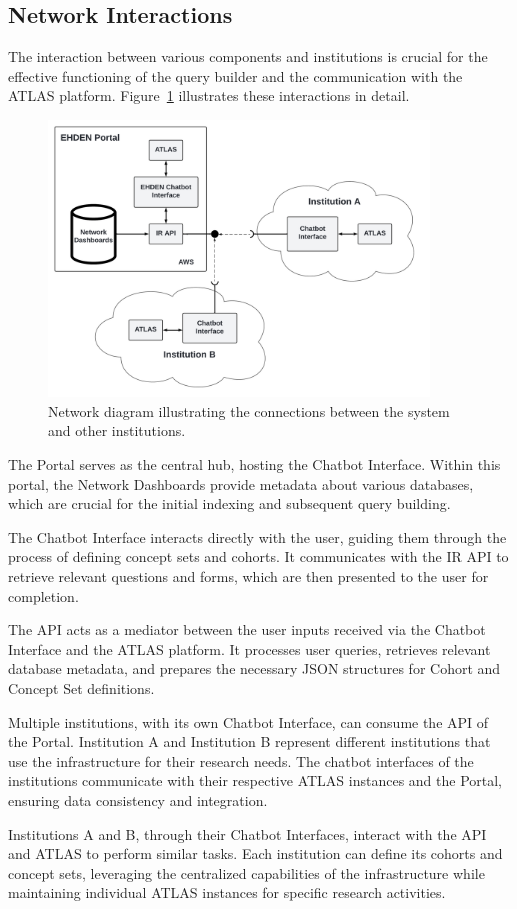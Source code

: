 \subsection{Network Interactions}

The interaction between various components and institutions is crucial for the effective functioning of the query builder and the communication with the ATLAS platform. Figure~\ref{fig_network} illustrates these interactions in detail.

\begin{figure}[H]
  \includegraphics[width=0.9\textwidth]{figs/chapter4/network_diagram.png}
  \centering
  \caption[Network diagram between components]{Network diagram illustrating the connections between the system and other institutions.}
  \label{fig_network}
\end{figure}

The {\ehden} Portal serves as the central hub, hosting the {\ehden} Chatbot Interface. Within this portal, the Network Dashboards provide metadata about various databases, which are crucial for the initial indexing and subsequent query building.

The {\ehden} Chatbot Interface interacts directly with the user, guiding them through the process of defining concept sets and cohorts. It communicates with the IR API to retrieve relevant questions and forms, which are then presented to the user for completion.

The {\ir} API acts as a mediator between the user inputs received via the Chatbot Interface and the ATLAS platform. It processes user queries, retrieves relevant database metadata, and prepares the necessary JSON structures for Cohort and Concept Set definitions.

Multiple institutions, with its own Chatbot Interface, can consume the {\ir} API of the {\ehden} Portal. Institution A and Institution B represent different institutions that use the {\ehden} infrastructure for their research needs. The chatbot interfaces of the institutions communicate with their respective ATLAS instances and the {\ehden} Portal, ensuring data consistency and integration.

Institutions A and B, through their Chatbot Interfaces, interact with the {\ir} API and ATLAS to perform similar tasks. Each institution can define its cohorts and concept sets, leveraging the centralized capabilities of the {\ehden} infrastructure while maintaining individual ATLAS instances for specific research activities.
